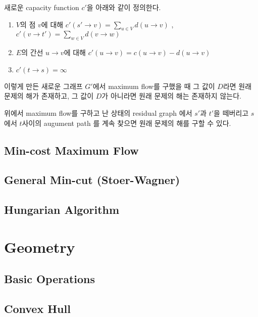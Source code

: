 \documentclass[8pt,landscape,a4paper,twocolumn]{article}
\begin{document}
새로운 capacity function $c'$을 아래와 같이 정의한다.

\begin{enumerate}
\item $V$의 점 $v$에 대해 $c'(s' \to v) = \sum_{u \in V} d(u \to v)$ , $c'(v \to t') = \sum_{w \in V} d(v \to w)$
\item $E$의 간선 $u \to v$에 대해 $c'(u \to v) = c(u \to v) - d(u \to v)$
\item $c'(t \to s) = \infty$
\end{enumerate}

이렇게 만든 새로운 그래프 $G'$에서 maximum flow를 구했을 때 그 값이 $D$라면 원래 문제의 해가 존재하고, 그 값이 $D$가 아니라면 원래 문제의 해는 존재하지 않는다.

위에서 maximum flow를 구하고 난 상태의 residual graph 에서 $s'$과 $t'$을 떼버리고 $s$에서 $t$사이의 augument path 를 계속 찾으면 원래 문제의 해를 구할 수 있다.



\subsection{Min-cost Maximum Flow}


\subsection{General Min-cut (Stoer-Wagner)}


\subsection{Hungarian Algorithm}


\section{Geometry}

\subsection{Basic Operations}


\subsection{Convex Hull}

\end{document}
